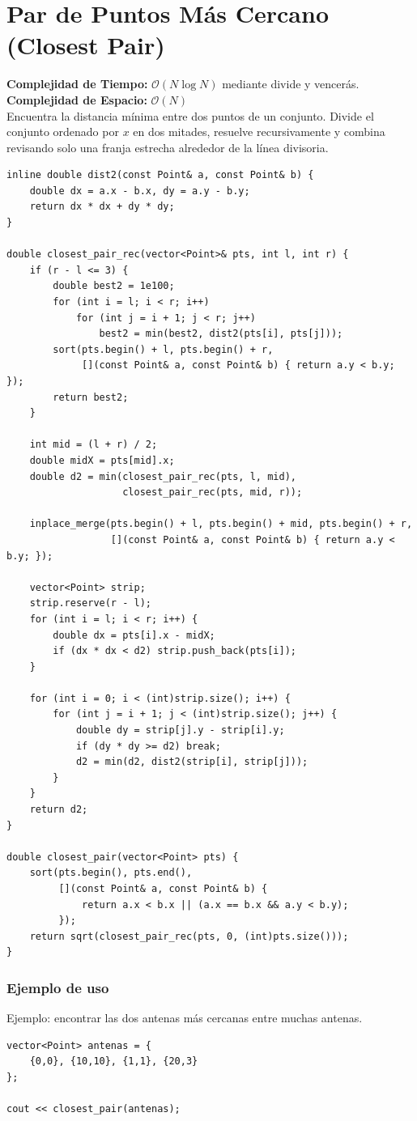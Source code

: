 \documentclass[10pt,twocolumn,letterpaper]{report}
\begin{document}
\section{Par de Puntos Más Cercano (Closest Pair)}
\textbf{Complejidad de Tiempo:} $\mathcal{O}(N \log N)$ mediante divide y vencerás. \\
\textbf{Complejidad de Espacio:} $\mathcal{O}(N)$ \\
Encuentra la distancia mínima entre dos puntos de un conjunto. Divide el conjunto ordenado por $x$ en dos mitades, resuelve recursivamente y combina revisando solo una franja estrecha alrededor de la línea divisoria.
\begin{lstlisting}
inline double dist2(const Point& a, const Point& b) {
    double dx = a.x - b.x, dy = a.y - b.y;
    return dx * dx + dy * dy;
}

double closest_pair_rec(vector<Point>& pts, int l, int r) {
    if (r - l <= 3) {
        double best2 = 1e100;
        for (int i = l; i < r; i++)
            for (int j = i + 1; j < r; j++)
                best2 = min(best2, dist2(pts[i], pts[j]));
        sort(pts.begin() + l, pts.begin() + r,
             [](const Point& a, const Point& b) { return a.y < b.y; });
        return best2;
    }

    int mid = (l + r) / 2;
    double midX = pts[mid].x;
    double d2 = min(closest_pair_rec(pts, l, mid),
                    closest_pair_rec(pts, mid, r));

    inplace_merge(pts.begin() + l, pts.begin() + mid, pts.begin() + r,
                  [](const Point& a, const Point& b) { return a.y < b.y; });

    vector<Point> strip;
    strip.reserve(r - l);
    for (int i = l; i < r; i++) {
        double dx = pts[i].x - midX;
        if (dx * dx < d2) strip.push_back(pts[i]);
    }

    for (int i = 0; i < (int)strip.size(); i++) {
        for (int j = i + 1; j < (int)strip.size(); j++) {
            double dy = strip[j].y - strip[i].y;
            if (dy * dy >= d2) break;
            d2 = min(d2, dist2(strip[i], strip[j]));
        }
    }
    return d2;
}

double closest_pair(vector<Point> pts) {
    sort(pts.begin(), pts.end(),
         [](const Point& a, const Point& b) {
             return a.x < b.x || (a.x == b.x && a.y < b.y);
         });
    return sqrt(closest_pair_rec(pts, 0, (int)pts.size()));
}
\end{lstlisting}
\subsubsection*{Ejemplo de uso}
Ejemplo: encontrar las dos antenas más cercanas entre muchas antenas.
\begin{lstlisting}
vector<Point> antenas = {
    {0,0}, {10,10}, {1,1}, {20,3}
};

cout << closest_pair(antenas);
\end{lstlisting}
\end{document}
